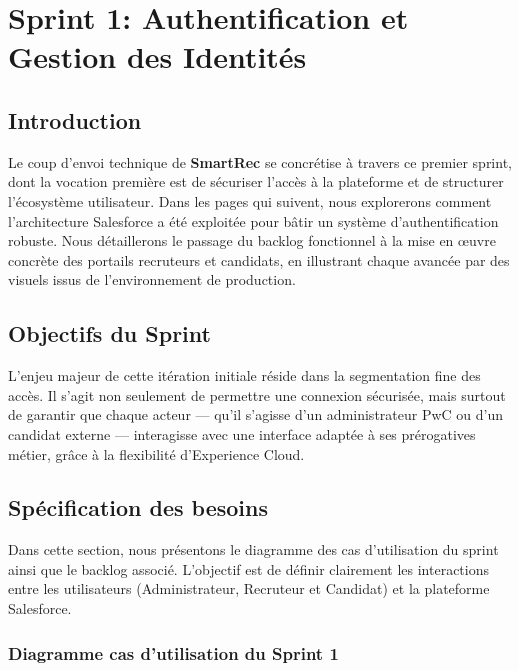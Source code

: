 
\chapter{Sprint 1: Authentification et Gestion des Identités}
\renewcommand{\mtctitle}{Sommaire}
\minitoc
	\newpage

\section*{Introduction}
Le coup d'envoi technique de \textbf{SmartRec} se concrétise à travers ce premier sprint, dont la vocation première est de sécuriser l'accès à la plateforme et de structurer l'écosystème utilisateur. Dans les pages qui suivent, nous explorerons comment l'architecture Salesforce a été exploitée pour bâtir un système d'authentification robuste. Nous détaillerons le passage du backlog fonctionnel à la mise en œuvre concrète des portails recruteurs et candidats, en illustrant chaque avancée par des visuels issus de l'environnement de production.

\section{Objectifs du Sprint}
L’enjeu majeur de cette itération initiale réside dans la segmentation fine des accès. Il s'agit non seulement de permettre une connexion sécurisée, mais surtout de garantir que chaque acteur — qu'il s'agisse d'un administrateur PwC ou d'un candidat externe — interagisse avec une interface adaptée à ses prérogatives métier, grâce à la flexibilité d'Experience Cloud.


\section{Spécification des besoins}
\par Dans cette section, nous présentons le diagramme des cas d’utilisation du sprint ainsi que le backlog associé. L'objectif est de définir clairement les interactions entre les utilisateurs (Administrateur, Recruteur et Candidat) et la plateforme Salesforce.
\subsection{Diagramme cas d’utilisation du Sprint 1}

